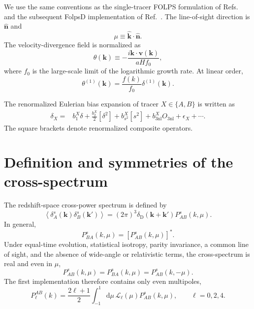 \documentclass[11pt,a4paper]{article}
\newcommand{\bs}[1]{\boldsymbol{#1}}
\newcommand{\dd}{\mathrm{d}}
\newcommand{\PD}{\delta_{\mathrm{D}}}
\begin{document}
We use the same conventions as the single-tracer FOLPS formulation of Refs.~\cite{Aviles2021,Noriega2022} and the subsequent FolpsD implementation of Ref.~\cite{FolpsD2026}. The line-of-sight direction is $\hat{\bs{n}}$ and
\begin{equation}
    \mu \equiv \hat{\bs{k}}\cdot\hat{\bs{n}}.
\end{equation}
The velocity-divergence field is normalized as
\begin{equation}
    \theta(\bs{k})
    \equiv
    -\frac{i\bs{k}\cdot\bs{v}(\bs{k})}{aHf_0},
\end{equation}
where $f_0$ is the large-scale limit of the logarithmic growth rate. At linear order,
\begin{equation}
    \theta^{(1)}(\bs{k})
    =
    \frac{f(k)}{f_0}\delta^{(1)}(\bs{k}).
\end{equation}

The renormalized Eulerian bias expansion of tracer $X\in\{A,B\}$ is written as
\begin{equation}
\begin{split}
    \delta_X
    ={}&
    b_1^X\delta
    +\frac{b_2^X}{2}[\delta^2]
    +b_{s^2}^X[s^2]
    +b_{3\mathrm{nl}}^X O_{3\mathrm{nl}}
    +\epsilon_X
    +\cdots .
\end{split}
\label{eq:bias_expansion_cross}
\end{equation}
The square brackets denote renormalized composite operators.

\section{Definition and symmetries of the cross-spectrum}
\label{sec:def}

The redshift-space cross-power spectrum is defined by
\begin{equation}
    \left\langle
        \delta_A^s(\bs{k})
        \delta_B^s(\bs{k}')
    \right\rangle
    =
    (2\pi)^3
    \PD(\bs{k}+\bs{k}')
    P_{AB}^s(k,\mu).
\end{equation}
In general,
\begin{equation}
    P_{BA}^s(k,\mu)
    =
    \left[P_{AB}^s(k,\mu)\right]^*.
\end{equation}
Under equal-time evolution, statistical isotropy, parity invariance, a common line of sight, and the absence of wide-angle or relativistic terms, the cross-spectrum is real and even in $\mu$,
\begin{equation}
    P_{AB}^s(k,\mu)
    =P_{BA}^s(k,\mu)
    =P_{AB}^s(k,-\mu).
\end{equation}
The first implementation therefore contains only even multipoles,
\begin{equation}
    P_{\ell}^{AB}(k)
    =
    \frac{2\ell+1}{2}
    \int_{-1}^{1}\dd\mu\,
    \mathcal{L}_{\ell}(\mu)
    P_{AB}^s(k,\mu),
    \qquad \ell=0,2,4.
\end{equation}
\end{document}
